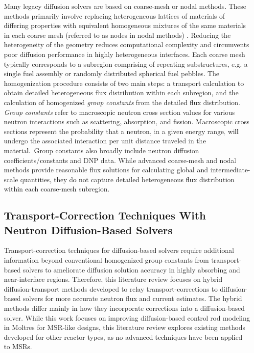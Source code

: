 Many legacy diffusion solvers are based on coarse-mesh or nodal methods. These methods
primarily involve replacing heterogeneous lattices of materials of differing properties with
equivalent homogeneous mixtures of the same materials in each coarse mesh (referred to as nodes in
nodal methods) \cite{stacey_nuclear_2007}. Reducing the heterogeneity of the geometry reduces
computational complexity and circumvents poor diffusion performance in highly heterogeneous
interfaces. Each coarse mesh typically corresponds to a subregion comprising of repeating
substructures, e.g. a single fuel assembly or randomly distributed spherical fuel pebbles. The
homogenization procedure consists of two main steps: a transport calculation to obtain detailed
heterogeneous flux distribution within each subregion, and the calculation of homogenized
\textit{group constants} from the detailed flux distribution. \textit{Group constants} refer to
macroscopic neutron cross section values for various neutron interactions such as
scattering, absorption, and fission. Macroscopic cross sections represent the probability that a
neutron, in a given energy range, will undergo the associated interaction per unit distance
traveled in the material.\ Group constants also broadly include neutron diffusion
coefficients/constants and \gls{DNP} data. While advanced coarse-mesh and nodal
methods provide reasonable flux solutions for calculating global and intermediate-scale quantities,
they do not capture detailed heterogeneous flux distribution within each coarse-mesh subregion.

\subsection{Transport-Correction Techniques With Neutron Diffusion-Based Solvers}

Transport-correction techniques for diffusion-based solvers require additional information beyond
conventional homogenized group constants from transport-based solvers to ameliorate diffusion
solution accuracy in highly absorbing and near-interface regions.
Therefore, this literature review focuses on hybrid diffusion-transport methods developed to relay
transport-corrections to diffusion-based solvers for more accurate neutron flux and current
estimates. The hybrid methods differ mainly in how they incorporate corrections into a
diffusion-based solver. While this work focuses on improving diffusion-based control rod
modeling in Moltres for \gls{MSR}-like designs, this literature review explores existing methods
developed for other reactor types, as no advanced techniques have been applied to \glspl{MSR}.

